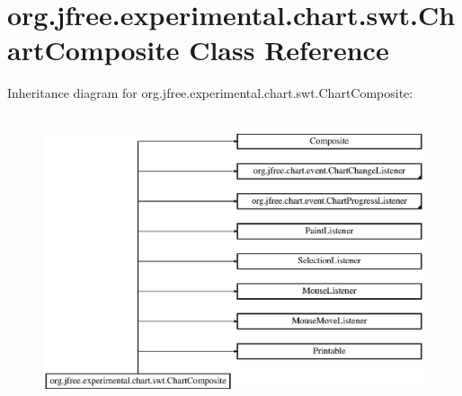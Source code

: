 \hypertarget{classorg_1_1jfree_1_1experimental_1_1chart_1_1swt_1_1_chart_composite}{}\section{org.\+jfree.\+experimental.\+chart.\+swt.\+Chart\+Composite Class Reference}
\label{classorg_1_1jfree_1_1experimental_1_1chart_1_1swt_1_1_chart_composite}
Inheritance diagram for org.\+jfree.\+experimental.\+chart.\+swt.\+Chart\+Composite\+:\begin{figure}[H]
\begin{center}
\leavevmode
\includegraphics[height=8.630136cm]{classorg_1_1jfree_1_1experimental_1_1chart_1_1swt_1_1_chart_composite}
\end{center}
\end{figure}
